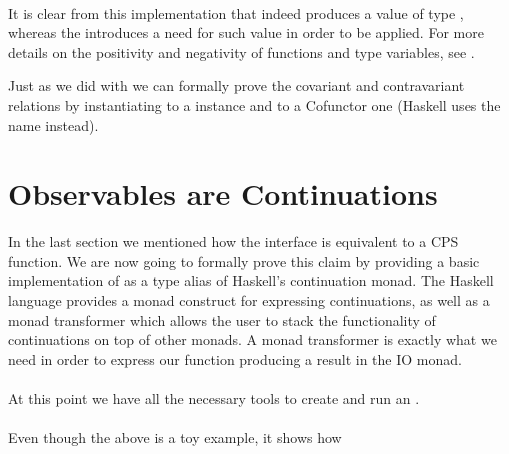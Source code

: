 \\

It is clear from this implementation that  indeed produces a value of type , whereas the  introduces a need for such value in order to be applied. For more details on the positivity and negativity of functions and type variables, see \cite{pos-neg}\cite{pos-neg2}.

Just as we did with  we can formally prove the covariant and contravariant relations by instantiating  to a  instance and  to a Cofunctor one (Haskell uses the name  instead).\\


\section{Observables are Continuations}


In the last section we mentioned how the  interface is equivalent to a CPS function. We are now going to formally prove this claim by providing a basic implementation of  as a type alias of Haskell's continuation monad. The Haskell language provides a monad construct for expressing continuations, as well as a monad transformer which allows the user to stack the functionality of continuations on top of other monads. A monad transformer is exactly what we need in order to express our  function producing a result in the IO monad.\\

\\

At this point we have all the necessary tools to create and run an .\\

\\

Even though the above is a toy example, it shows how 

